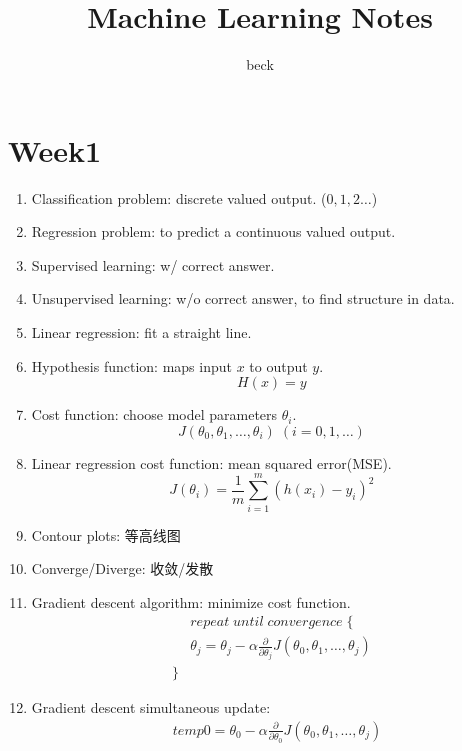 \documentclass[UTF8]{ctexart}
\begin{document}
\title{Machine Learning Notes}
\author{beck}
\maketitle
\vfill
\clearpage
\section*{Week1}
\begin{enumerate}
    \item Classification problem: discrete valued output. ($0,1,2\ldots$)
    \item Regression problem: to predict a continuous valued output.
    \item Supervised learning: w/ correct answer.
    \item Unsupervised learning: w/o correct answer, to find structure in data.
    \item Linear regression: fit a straight line.
    \item Hypothesis function: maps input $x$ to output $y$.
          \[
              H(x) = y
          \]
    \item Cost function: choose model parameters $\theta_i$.
          \[
              J(\theta_0, \theta_1, \ldots, \theta_i)\; (i = 0, 1, \ldots)
          \]
    \item Linear regression cost function: mean squared error(MSE).
          \[
              J(\theta_i) = \frac{1}{m} \sum_{i=1}^{m} (h(x_i) - y_i)^2
          \]
    \item Contour plots: 等高线图
    \item Converge/Diverge: 收敛/发散
    \item Gradient descent algorithm: minimize cost function.
          \[
              \begin{aligned}
                   & repeat\; until\; convergence\; \{                                                                      \\
                   & \theta_j = \theta_j - \alpha \frac{\partial}{\partial\theta_j} J(\theta_0, \theta_1, \ldots, \theta_j) \\
                  \}
              \end{aligned}
          \]
    \item Gradient descent simultaneous update:
          \[
              \begin{aligned}
                   & temp0 = \theta_0 - \alpha \frac{\partial}{\partial\theta_0} J(\theta_0, \theta_1, \ldots, \theta_j) \\

\end{aligned}\]
\end{enumerate}
\end{document}
